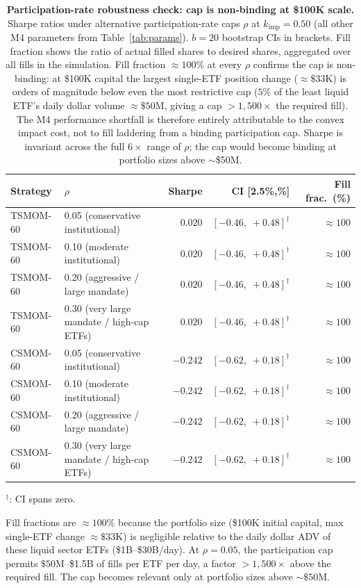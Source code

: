 \documentclass[12pt]{article}
\newcommand{\kimp}{k_{\mathrm{imp}}}
\begin{document}
\begin{table}[H]
\centering
\caption{\textbf{Participation-rate robustness check: cap is non-binding at \$100K scale.}
Sharpe ratios under alternative participation-rate caps $\rho$
at $\kimp = 0.50$ (all other M4 parameters from Table~\ref{tab:params}).
$b = 20$ bootstrap CIs in brackets. Fill fraction shows the ratio
of actual filled shares to desired shares, aggregated over all fills
in the simulation. Fill fraction $\approx 100\%$ at every $\rho$ confirms
the cap is non-binding: at \$100K capital the largest single-ETF
position change ($\approx\$33$K) is orders of magnitude below even the
most restrictive cap ($5\%$ of the least liquid ETF's daily dollar
volume $\approx\$50$M, giving a cap $> 1{,}500\times$ the required fill).
The M4 performance shortfall is therefore entirely attributable to the
convex impact cost, not to fill laddering from a binding participation cap.
Sharpe is invariant across the full $6\times$ range of $\rho$;
the cap would become binding at portfolio sizes above $\sim$\$50M.}
\label{tab:rho_sweep}
\small
\begin{tabular}{llrrr}
\toprule
Strategy & $\rho$ & Sharpe & CI [2.5\%,\;97.5\%] & Fill frac.\ (\%) \\
\midrule
TSMOM-60 & 0.05 (conservative institutional)
  & $0.020$ & $[-0.46,\;+0.48]^\dagger$ & ${\approx}100$ \\
TSMOM-60 & 0.10 (moderate institutional)
  & $0.020$ & $[-0.46,\;+0.48]^\dagger$ & ${\approx}100$ \\
TSMOM-60 & 0.20 (aggressive / large mandate)
  & $0.020$ & $[-0.46,\;+0.48]^\dagger$ & ${\approx}100$ \\
TSMOM-60 & 0.30 (very large mandate / high-cap ETFs)
  & $0.020$ & $[-0.46,\;+0.48]^\dagger$ & ${\approx}100$ \\
\midrule
CSMOM-60 & 0.05 (conservative institutional)
  & $-0.242$ & $[-0.62,\;+0.18]^\dagger$ & ${\approx}100$ \\
CSMOM-60 & 0.10 (moderate institutional)
  & $-0.242$ & $[-0.62,\;+0.18]^\dagger$ & ${\approx}100$ \\
CSMOM-60 & 0.20 (aggressive / large mandate)
  & $-0.242$ & $[-0.62,\;+0.18]^\dagger$ & ${\approx}100$ \\
CSMOM-60 & 0.30 (very large mandate / high-cap ETFs)
  & $-0.242$ & $[-0.62,\;+0.18]^\dagger$ & ${\approx}100$ \\
\bottomrule
\end{tabular}
\begin{tablenotes}\small
\item $^\dagger$: CI spans zero.
\item Fill fractions are $\approx 100\%$ because the portfolio size
  (\$100K initial capital, max single-ETF change $\approx\$33$K) is
  negligible relative to the daily dollar ADV of these liquid sector
  ETFs (\$1B--\$30B/day). At $\rho = 0.05$, the participation cap
  permits $\$50$M--\$1.5B of fills per ETF per day, a factor
  $> 1{,}500\times$ above the required fill. The cap becomes relevant
  only at portfolio sizes above $\sim\$50$M.
\end{tablenotes}
\end{table}
\end{document}
